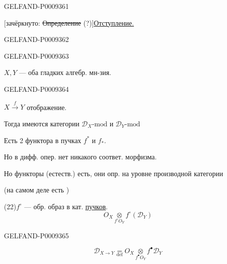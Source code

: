 \begin{GelfandAdjacentEvidence}{GELFAND-P000936}{1}

[зачёркнуто: \sout{Определение} (?)]\qquad\underline{Отступление.}
\end{GelfandAdjacentEvidence}
\begin{GelfandAdjacentEvidence}{GELFAND-P000936}{2}

\end{GelfandAdjacentEvidence}
\begin{GelfandAdjacentEvidence}{GELFAND-P000936}{3}


$X,Y$ --- оба гладких алгебр. мн-зия.
\end{GelfandAdjacentEvidence}
\begin{GelfandAdjacentEvidence}{GELFAND-P000936}{4}


$X\overset f\longrightarrow Y$ отображение.

Тогда имеются категории $\mathcal D_X\text{-mod}$ и $\mathcal D_Y\text{-mod}$

Есть 2 функтора в пучках $f^*$ и $f_*$.

Но в дифф. опер. нет никакого соответ. морфизма.

Но функторы (естеств.) есть, они опр. на уровне производной категории

(на самом деле есть )

(22)\quad $f^\circ$ --- обр. образ в кат. \underline{\underline{пучков}}.
\begin{equation*}
 O_X\mathbin{\underset{f^\circ O_Y}{\otimes}} f^\circ(\mathcal D_Y)
 \tag{23}
\end{equation*}
\end{GelfandAdjacentEvidence}
\begin{GelfandAdjacentEvidence}{GELFAND-P000936}{5}


\begin{equation*}
 \mathcal D_{X\to Y}\underset{\mathrm{def}}{=}
 O_X\mathbin{\underset{f^\bullet O_Y}{\otimes}} f^\bullet\mathcal D_Y
 \tag{24}
\end{equation*}
\end{GelfandAdjacentEvidence}
